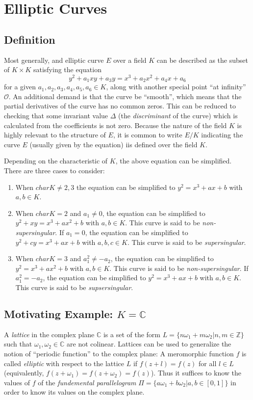 \documentclass[11pt,english]{article}
\begin{document}
\section{Elliptic Curves}
\subsection{Definition}
Most generally, and elliptic curve $E$ over a field $K$ can be described as the subset of $K\times K$ satisfying the equation $$y^2+a_1xy+a_3y=x^3+a_2x^2+a_4x+a_6$$ 
for a given $a_1,a_2,a_3,a_4,a_5,a_6\in K$, along with another special point ``at infinity'' $\mathcal{O}$. An additional demand is that the curve be ``smooth'',
which means that the partial derivatives of the curve has no common zeros. This can be reduced to checking that some invariant value $\Delta$ (the \emph{discriminant} of the curve)
which is calculated from the coefficients is not zero. Because the nature of the field $K$ is highly relevant to the structure of $E$,
it is common to write $E/K$ indicating the curve $E$ (usually given by the equation) iis defined over the field $K$.

Depending on the characteristic of $K$, the above equation can be simplified. There are three cases to consider:
\begin{enumerate}
  \item When $charK\ne 2,3$ the equation can be simplified to $y^2=x^3+ax+b$ with $a,b\in K$.
  \item When $charK = 2$ and $a_1 \ne 0$, the equation can be simplified to $y^2+xy=x^3+ax^2+b$ with $a,b\in K$. This curve is said to be \emph{non-supersingular}. If $a_1 = 0$, the equation can be simplified to $y^2+cy=x^3+ax+b$ with $a,b,c\in K$. This curve is said to be \emph{supersingular}.
  \item When $charK = 3$ and $a_1^2\ne -a_2$, the equation can be simplified to $y^2=x^3+ax^2+b$ with $a,b\in K$. This curve is said to be \emph{non-supersingular}. If $a_1^2=-a_2$, the equation can be simplified to $y^2=x^3+ax+b$ with $a,b\in K$. This curve is said to be \emph{supsersingular}.
\end{enumerate}

\subsection{Motivating Example: $K=\mathbb{C}$}
A \emph{lattice} in the complex plane $\mathbb{C}$ is a set of the form $L=\{n\omega_1+m\omega_2|n,m\in\mathbb{Z}\}$ such that $\omega_1,\omega_2\in\mathbb{C}$ are
not colinear. Lattices can be used to generalize the notion of ``periodic function'' to the complex plane: A meromorphic function $f$ is called \emph{elliptic} with respect to the lattice
$L$ if $f(z+l)=f(z)$ for all $l\in L$ (equivalently, $f(z+\omega_1)=f(z+\omega_2)=f(z)$). Thus it suffices to know the values of $f$ of the \emph{fundemental parallelogram} $\Pi=\{a\omega_1+b\omega_2|a,b\in[0,1]\}$
in order to know its values on the complex plane.
\end{document}
